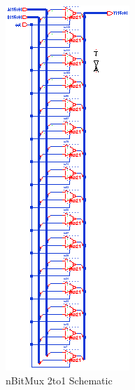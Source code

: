 \documentclass[11pt]{article}
\begin{document}
		\begin{figure}[H] 
			\centering 
			\includegraphics[width=\textwidth,height=\dimexpr\textheight-4\baselineskip-\abovecaptionskip-\belowcaptionskip\relax,keepaspectratio]{"Pictures/nBitMux_2to1 Schematic"}
			\caption{nBitMux 2to1 Schematic} 
			\label{fig:nBitMux-2to1-Schematic} 
		\end{figure}
	
\end{document}

